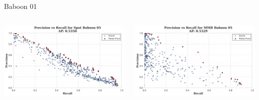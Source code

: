 \begin{frame}{Baboon 01}
    \begin{columns}
        \begin{column}{0.5\textwidth}
            \centering
            \includegraphics[width=\textwidth,keepaspectratio]{images/bom/precision_recall_Spot_Baboon_05.png}
        \end{column}
        \begin{column}{0.5\textwidth}
            \centering
            \includegraphics[width=\textwidth,keepaspectratio]{images/bom/precision_recall_MMB_Baboon_05.png}
        \end{column}
    \end{columns}
\end{frame}

